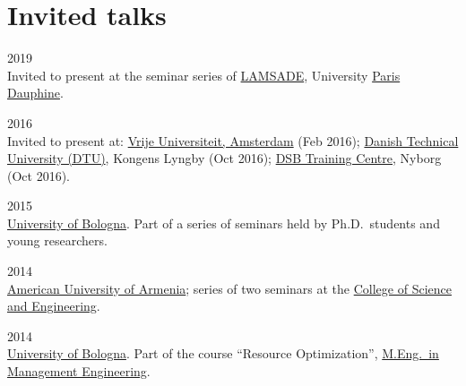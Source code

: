 \section*{Invited talks}

\begin{paracol}{2}
  2019
\switchcolumn
  \\
  Invited to present at the seminar series of \href{https://www.lamsade.dauphine.fr/}{LAMSADE}, University \href{https://www.dauphine.psl.eu/}{Paris Dauphine}.
\end{paracol}

\begin{paracol}{2}
  2016
\switchcolumn
  \\
  Invited to present at: \href{https://www.vu.nl/}{Vrije Universiteit, Amsterdam} (Feb 2016); \href{https://www.dtu.dk/}{Danish Technical University (DTU)}, Kongens Lyngby (Oct 2016); \href{https://www.dsb.dk/}{DSB Training Centre}, Nyborg (Oct 2016).
\end{paracol}

\begin{paracol}{2}
  2015
\switchcolumn
  \\
  \href{https://www.unibo.it}{University of Bologna}. Part of a series of seminars held by Ph.D.\ students and young researchers.
\end{paracol}

\begin{paracol}{2}
  2014
\switchcolumn
  \\
  \href{https://www.aua.am/}{American University of Armenia}; series of two seminars at the \href{http://cse.aua.am/}{College of Science and Engineering}.
\end{paracol}

\begin{paracol}{2}
  2014
\switchcolumn
  \\
  \href{https://www.unibo.it}{University of Bologna}. Part of the course ``Resource Optimization'', \href{https://corsi.unibo.it/magistrale/IngegneriaGestionale}{M.Eng.\ in Management Engineering}.
\end{paracol}
